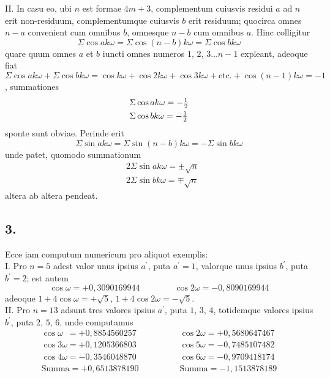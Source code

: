 \documentclass[twoside,12pt]{memoir}
\let\oldfrac\frac
\def\frac#1#2{\mathchoice{\tfrac{#1}{#2}}{\oldfrac{#1}{#2}}{\genfrac{}{}{}{2}{#1}{#2\mathstrut}}{\genfrac{}{}{}{3}{#1}{#2\mathstrut}}}
\begin{document}
II. In casu eo, ubi \(n\) est formae \(4 m+3\), complementum cuiusvis residui \(a\) ad \(n\) erit non-residuum, complementumque cuiusvis \(b\) erit residuum; quocirca omnes \(n-a\) convenient cum omnibus \(b\), omnesque \(n-b\) cum omnibus \(a\). Hinc colligitur
\[\Sigma \cos a k \omega=\Sigma \cos (n-b) k \omega=\Sigma \cos b k \omega\]
quare quum omnes \(a\) et \(b\) iuncti omnes numeros \(1\), \(2\), \(3 \ldots n-1\) expleant, adeoque fiat \(\Sigma \cos a k \omega+\Sigma \cos b k \omega=\cos k \omega+\cos 2 k \omega+\cos 3 k \omega+\text{etc.}+\cos (n-1) k \omega=-1\), summationes
\[\begin{aligned}
& \Sigma \cos a k \omega=-\frac{1}{2} \\
& \Sigma \cos b k \omega=-\frac{1}{2}
\end{aligned}\]
sponte sunt obviae. Perinde erit
\[\Sigma \sin a k \omega=\Sigma \sin (n-b) k \omega=-\Sigma \sin b k \omega\]\pagebreak%
unde patet, quomodo summationum
\[\begin{aligned}
& 2 \Sigma \sin a k \omega= \pm \surd n \\
& 2 \Sigma \sin b k \omega= \mp \surd n
\end{aligned}\]
altera ab altera pendeat.

\subsection*{3.}
 
Ecce iam computum numericum pro aliquot exemplis:\\
 
I. Pro \(n=5\) adest valor unus ipsius \(a^{\prime}\), puta \(a^{\prime}=1\), valorque unus ipsius \(b^{\prime}\), puta \(b^{\prime}=2\); est autem
\[\cos \omega=+0{,}3090169944 \qquad \qquad \cos 2 \omega=-0{,}8090169944\]
adeoque \(1+4 \cos \omega=+\surd 5\), \(1+4 \cos 2 \omega=-\surd 5\).\\

II. Pro \(n=13\) adsunt tres valores ipsius \(a^{\prime}\), puta \(1\), \(3\), \(4\), totidemque valores ipsius \(b^{\prime}\), puta \(2\), \(5\), \(6\), unde computamus
\[ \begin{array}{r} 
\cos \omega\phantom{1} = + 0{,}8854560257 \\
\cos 3\omega = + 0{,}1205366803 \\ 
\cos 4 \omega = - 0{,}3546048870 \\  
\hline \text{Summa} = + 0{,}6513878190 \end{array} 
\qquad \qquad
\begin{array}{r} 
\cos 2\omega = + 0{,}5680647467 \\ 
\cos 5\omega = - 0{,}7485107482 \\ 
\cos 6 \omega = - 0{,}9709418174 \\ 
\hline \text{Summa} = - 1{,}1513878189 \end{array} \]
 
\end{document}
